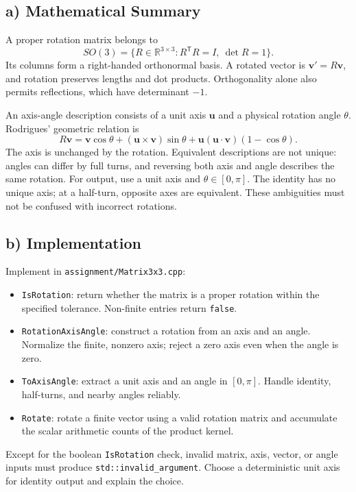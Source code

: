 \documentclass[11pt,a4paper]{article}
\newcommand{\R}{\mathbb{R}}
\newcommand{\vect}[1]{\bm{#1}}
\begin{document}
\subsection*{a) Mathematical Summary}

A proper rotation matrix belongs to
\[
SO(3)=\{R\in\R^{3\times3}:R^{\mathsf T}R=I,\ \det R=1\}.
\]
Its columns form a right-handed orthonormal basis. A rotated vector is
$\vect{v}'=R\vect{v}$, and rotation preserves lengths and dot products.
Orthogonality alone also permits reflections, which have determinant $-1$.

An axis-angle description consists of a unit axis $\vect{u}$ and a physical
rotation angle $\theta$. Rodrigues' geometric relation is
\[
R\vect{v}
=\vect{v}\cos\theta
+(\vect{u}\times\vect{v})\sin\theta
+\vect{u}(\vect{u}\cdot\vect{v})(1-\cos\theta).
\]
The axis is unchanged by the rotation. Equivalent descriptions are not unique:
angles can differ by full turns, and reversing both axis and angle describes
the same rotation. For output, use a unit axis and $\theta\in[0,\pi]$.
The identity has no unique axis; at a half-turn, opposite axes are equivalent.
These ambiguities must not be confused with incorrect rotations.

\subsection*{b) Implementation}

Implement in \texttt{assignment/Matrix3x3.cpp}:
\begin{itemize}[leftmargin=*]
    \item \texttt{IsRotation}: return whether the matrix is a proper rotation
    within the specified tolerance. Non-finite entries return \texttt{false}.
    \item \texttt{RotationAxisAngle}: construct a rotation from an axis and
    an angle. Normalize the finite, nonzero axis; reject a zero axis even when
    the angle is zero.
    \item \texttt{ToAxisAngle}: extract a unit axis and an angle in $[0,\pi]$.
    Handle identity, half-turns, and nearby angles reliably.
    \item \texttt{Rotate}: rotate a finite vector using a valid rotation
    matrix and accumulate the scalar arithmetic counts of the product kernel.
\end{itemize}

Except for the boolean \texttt{IsRotation} check, invalid matrix, axis, vector,
or angle inputs must produce \texttt{std::invalid\_argument}. Choose a
deterministic unit axis for identity output and explain the choice.
\end{document}
